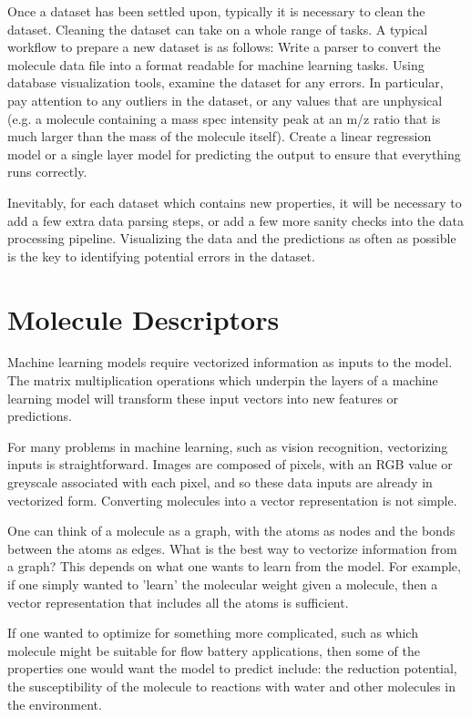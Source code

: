 Once a dataset has been settled upon, typically it is necessary to clean the dataset. Cleaning the dataset can take on a whole range of tasks. A typical workflow to prepare a new dataset is as follows:
Write a parser to convert the molecule data file into a format readable for machine learning tasks.
Using database visualization tools, examine the dataset for any errors. In particular, pay attention to any outliers in the dataset, or any values that are unphysical (e.g. a molecule containing a mass spec intensity peak at an m/z ratio that is much larger than the mass of the molecule itself).
Create a linear regression model or a single layer model for predicting the output to ensure that everything runs correctly.

Inevitably, for each dataset which contains new properties, it will be necessary to add a few extra data parsing steps, or add a few more sanity checks into the data processing pipeline. Visualizing the data and the predictions as often as possible is the key to identifying potential errors in the dataset.

\section{Molecule Descriptors}

Machine learning models require vectorized information as inputs to the model. The matrix multiplication operations which underpin the layers of a machine learning model will transform these input vectors into new features or predictions.

For many problems in machine learning, such as vision recognition, vectorizing inputs is straightforward. Images are composed of pixels, with an RGB value or greyscale associated with each pixel, and so these data inputs are already in vectorized form. Converting molecules into a vector representation is not simple.

One can think of a molecule as a graph, with the atoms as nodes and the bonds between the atoms as edges. What is the best way to vectorize information from a graph? This depends on what one wants to learn from the model. For example, if one simply wanted to 'learn' the molecular weight given a molecule, then a vector representation that includes all the atoms is sufficient.

If one wanted to optimize for something more complicated, such as which molecule might be suitable for  flow battery applications, then some of the properties one would want the model to predict include: the reduction potential, the susceptibility of the molecule to reactions with water and other molecules in the environment\cite{tabor_2018}.

